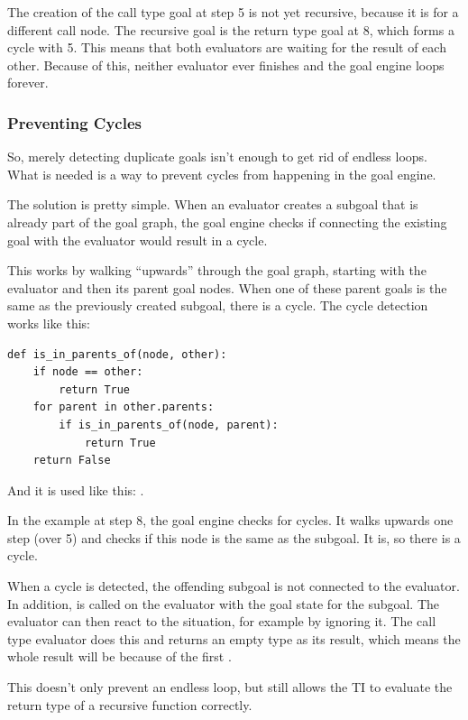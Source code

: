 \documentclass[12pt,halfparskip,DIV11,BCOR10mm]{scrreprt}
\begin{document}
The creation of the call type goal at step 5 is not yet recursive, because it is for a different call node. The recursive goal is the return type goal at 8, which forms a cycle with 5. This means that both evaluators are waiting for the result of each other. Because of this, neither evaluator ever finishes and the goal engine loops forever.

\subsubsection{Preventing Cycles}

So, merely detecting duplicate goals isn't enough to get rid of endless loops. What is needed is a way to prevent cycles from happening in the goal engine.

The solution is pretty simple. When an evaluator creates a subgoal that is already part of the goal graph, the goal engine checks if connecting the existing goal with the evaluator would result in a cycle.

This works by walking ``upwards'' through the goal graph, starting with the evaluator and then its parent goal nodes. When one of these parent goals is the same as the previously created subgoal, there is a cycle. The cycle detection works like this:

\begin{lstlisting}
def is_in_parents_of(node, other):
    if node == other:
        return True
    for parent in other.parents:
        if is_in_parents_of(node, parent):
            return True
    return False
\end{lstlisting}

And it is used like this: .

In the example at step 8, the goal engine checks for cycles. It walks upwards one step (over 5) and checks if this node is the same as the subgoal. It is, so there is a cycle.

When a cycle is detected, the offending subgoal is not connected to the evaluator. In addition,  is called on the evaluator with the  goal state for the subgoal. The evaluator can then react to the situation, for example by ignoring it. The call type evaluator does this and returns an empty type as its result, which means the whole result will be  because of the first .

This doesn't only prevent an endless loop, but still allows the TI to evaluate the return type of a recursive function correctly.
\end{document}
